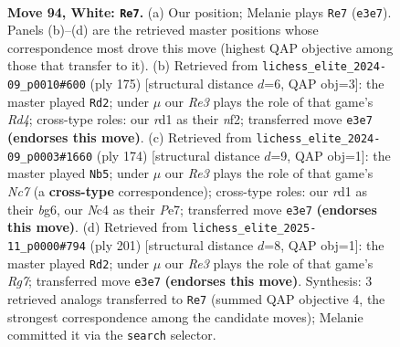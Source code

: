 \documentclass[11pt]{article}
\begin{document}
\clearpage

\begin{figure}[p]\centering
\begin{subfigure}{0.46\textwidth}\centering
\resizebox{\linewidth}{!}{%
\newchessgame
\chessboard[
  setfen={8/8/2k5/5K2/2N5/4R3/6P1/3r4 w - - 52 94},
  showmover=false,
  pgfstyle=straightmove, color=movearrow, markmove={e3-e7}
]}
\caption{}
\end{subfigure}\hfill
\begin{subfigure}{0.46\textwidth}\centering
\resizebox{\linewidth}{!}{%
\newchessgame
\chessboard[
  setfen={8/8/8/3r4/8/1k2n3/5N2/1K6 b - - 19 88},
  showmover=false,
  pgfstyle=straightmove, color=movearrow, markmove={d5-d2}
]}
\caption{}
\end{subfigure}
\\[4pt]
\begin{subfigure}{0.46\textwidth}\centering
\resizebox{\linewidth}{!}{%
\newchessgame
\chessboard[
  setfen={8/2N1P3/6b1/3K4/8/8/4k3/8 w - - 49 88},
  showmover=false,
  pgfstyle=straightmove, color=movearrow, markmove={c7-b5}
]}
\caption{}
\end{subfigure}\hfill
\begin{subfigure}{0.46\textwidth}\centering
\resizebox{\linewidth}{!}{%
\newchessgame
\chessboard[
  setfen={8/4R3/8/8/8/3n1k2/6r1/K7 b - - 33 101},
  showmover=false,
  pgfstyle=straightmove, color=movearrow, markmove={g2-d2}
]}
\caption{}
\end{subfigure}
\caption{\textbf{Move 94, White: \texttt{Re7}.} (a) Our position; Melanie plays \texttt{Re7} (\texttt{e3e7}). Panels (b)--(d) are the retrieved master positions whose correspondence most drove this move (highest QAP objective among those that transfer to it). (b) Retrieved from \texttt{lichess\_elite\_2024-09\_p0010\#600} (ply 175) [structural distance $d$=6, QAP obj=3]: the master played \texttt{Rd2}; under $\mu$ our \emph{Re3} plays the role of that game's \emph{Rd4}; cross-type roles: our \emph{r}d1 as their \emph{n}f2; transferred move \texttt{e3e7} \textbf{(endorses this move)}. (c) Retrieved from \texttt{lichess\_elite\_2024-09\_p0003\#1660} (ply 174) [structural distance $d$=9, QAP obj=1]: the master played \texttt{Nb5}; under $\mu$ our \emph{Re3} plays the role of that game's \emph{Nc7} (a \textbf{cross-type} correspondence); cross-type roles: our \emph{r}d1 as their \emph{b}g6, our \emph{N}c4 as their \emph{P}e7; transferred move \texttt{e3e7} \textbf{(endorses this move)}. (d) Retrieved from \texttt{lichess\_elite\_2025-11\_p0000\#794} (ply 201) [structural distance $d$=8, QAP obj=1]: the master played \texttt{Rd2}; under $\mu$ our \emph{Re3} plays the role of that game's \emph{Rg7}; transferred move \texttt{e3e7} \textbf{(endorses this move)}. Synthesis: 3 retrieved analogs transferred to \texttt{Re7} (summed QAP objective 4, the strongest correspondence among the candidate moves); Melanie committed it via the \texttt{search} selector.}
\label{fig:thought-m186}
\end{figure}
\end{document}
